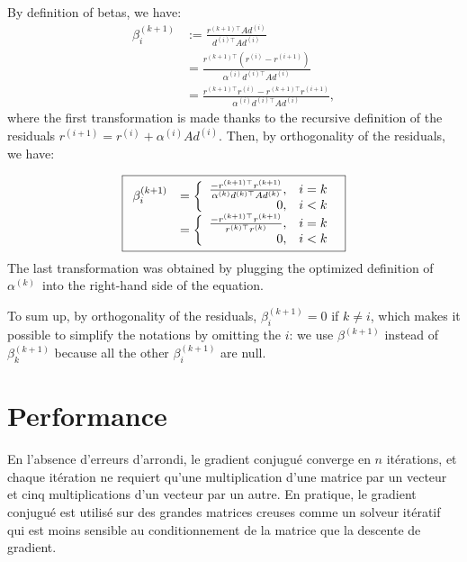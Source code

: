 \documentclass[notitlepage,oneside]{book}
\begin{document}
\begin{itemize}
By definition of betas, we have:
\begin{align*}
  \beta^{(k+1)}_i&:= \frac{r^{(k+1)\top}Ad^{(i)}  }{d^{(i)\top}Ad^{(i)}} \\
&= \frac{r^{(k+1)\top}(r^{(i)}- r^{(i+1)})  }{\alpha^{(i)} d^{(i)\top}Ad^{(i)}} \\
  &= \frac{r^{(k+1)\top}r^{(i)}- r^{(k+1)\top}r^{(i+1)}}{\alpha^{(i)} d^{(i)\top}Ad^{(i)}},
\end{align*}
where the first transformation is made thanks to the recursive definition of the residuals $r^{(i+1)}= r^{(i)}+\alpha^{(i)} A d^{(i)}$.
Then, by orthogonality of the residuals, we have:

\begin{equation}
\nonumber
\boxed{
\begin{array}{rcl}
\beta^{(k+1)}_i &= \left \{ \begin{array}{r l} \frac{- r^{(k+1)\top}r^{(k+1)}}{\alpha^{(k)} d^{(k)\top}Ad^{(k)}}, & i=k\\ 0, & i<k \end{array} \right. \\
                &= \left \{ \begin{array}{r l} \frac{- r^{(k+1)\top}r^{(k+1)}}{r^{(k)\top}r^{(k)}}, & i=k\\ 0, & i<k \end{array} \right. 
\end{array}
}
\end{equation}
The last transformation was obtained by plugging the optimized definition of $\alpha^{(k)}$ into the right-hand side of the equation.

To sum up, by orthogonality of the residuals, $\beta^{(k+1)}_i=0$ if $k\neq i$, which makes it possible to simplify the notations by omitting the $i$:
we use $\beta^{(k+1)}$ instead of $\beta_k^{(k+1)}$ because all the other $\beta_i^{(k+1)}$ are null.

\end{itemize}


\newpage
\section{Performance}

En l'absence d'erreurs d'arrondi, le gradient conjugué converge en $n$ itérations, et chaque itération
ne requiert qu'une multiplication d'une matrice par un vecteur et
cinq multiplications d'un vecteur par un autre. En pratique, le
gradient conjugué est utilisé sur des grandes matrices creuses comme
un solveur itératif qui est moins sensible au conditionnement de la
matrice que la descente de gradient.
\end{document}
